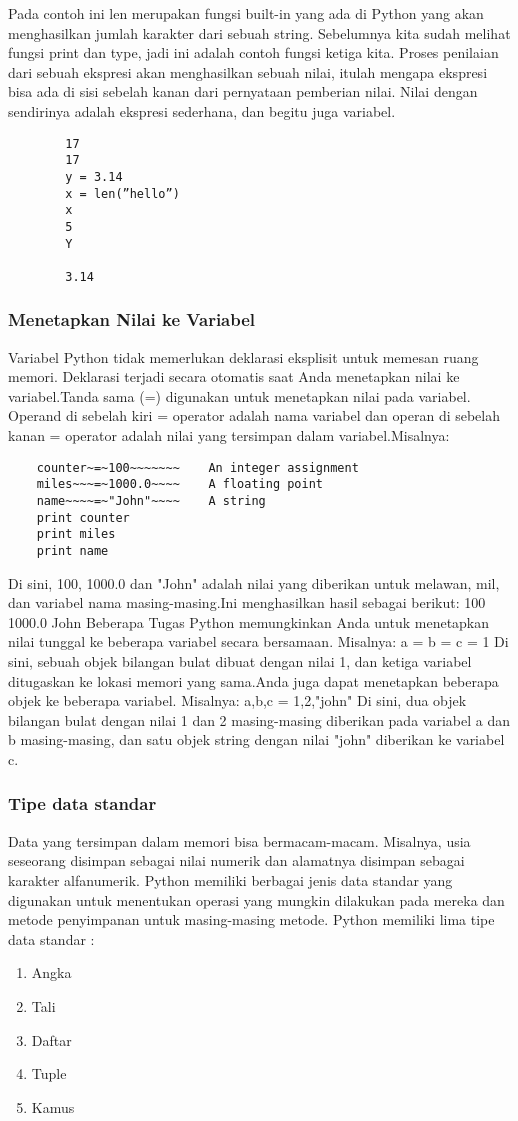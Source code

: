 Pada contoh ini len merupakan fungsi built-in yang ada di Python yang akan menghasilkan jumlah karakter dari sebuah string. Sebelumnya kita sudah melihat fungsi print dan type, jadi ini adalah contoh fungsi ketiga kita.
Proses penilaian dari sebuah ekspresi akan menghasilkan sebuah nilai, itulah mengapa ekspresi bisa ada di sisi sebelah kanan dari pernyataan pemberian nilai. Nilai dengan sendirinya adalah ekspresi sederhana, dan begitu juga variabel.
	\begin{verbatim}
		17
		17 
		y = 3.14 
		x = len(”hello”) 
		x 
		5 
		Y

		3.14
	\end{verbatim}
	
\subsubsection{Menetapkan Nilai ke Variabel}
	Variabel Python tidak memerlukan deklarasi eksplisit untuk memesan ruang memori. Deklarasi terjadi secara otomatis saat Anda menetapkan nilai ke variabel.Tanda sama (=) digunakan untuk menetapkan nilai pada variabel. 
Operand di sebelah kiri = operator adalah nama variabel dan operan di sebelah kanan = operator adalah nilai yang tersimpan dalam variabel.Misalnya:
\begin{verbatim}
	counter~=~100~~~~~~~    An integer assignment 
	miles~~~=~1000.0~~~~    A floating point 
	name~~~~=~"John"~~~~    A string 
	print counter 
	print miles 
	print name
\end{verbatim}
Di sini, 100, 1000.0 dan "John" adalah nilai yang diberikan untuk melawan, mil, dan variabel nama masing-masing.Ini menghasilkan hasil sebagai berikut:
	100 
	1000.0
	John 
	Beberapa Tugas 
Python memungkinkan Anda untuk menetapkan nilai tunggal ke beberapa variabel secara bersamaan. 
Misalnya:
	a = b = c = 1
Di sini, sebuah objek bilangan bulat dibuat dengan nilai 1, dan ketiga variabel ditugaskan ke lokasi memori yang sama.Anda juga dapat menetapkan beberapa objek ke beberapa variabel. 
Misalnya:
	a,b,c = 1,2,"john" 
Di sini, dua objek bilangan bulat dengan nilai 1 dan 2 masing-masing diberikan pada variabel a dan b masing-masing, dan satu objek string dengan nilai "john" diberikan ke variabel c. 

\subsubsection{Tipe data standar}
	Data yang tersimpan dalam memori bisa bermacam-macam. Misalnya, usia seseorang disimpan sebagai nilai numerik dan alamatnya disimpan sebagai karakter alfanumerik. Python memiliki berbagai jenis data standar yang digunakan untuk menentukan operasi yang mungkin dilakukan pada mereka dan metode penyimpanan untuk masing-masing metode.
Python memiliki lima tipe data standar :
\begin{enumerate}
	\item Angka
	\item Tali
	\item Daftar
	\item Tuple
	\item Kamus
\end{enumerate}

